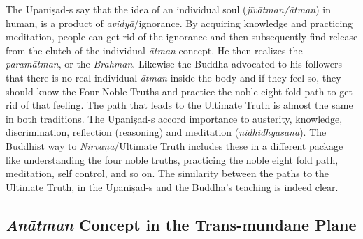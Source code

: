 The Upaniṣad-s say that the idea of an individual soul (\textit{jīvātman/ātman}) in human, is a product of \textit{avidyā}/ignorance. By acquiring knowledge and practicing meditation, people can get rid of the ignorance and then subsequently find release from the clutch of the individual \textit{ātman} concept. He then realizes the \textit{paramātman}, or the \textit{Brahman}. Likewise the Buddha advocated to his followers that there is no real individual \textit{ātman} inside the body and if they feel so, they should know the Four Noble Truths and practice the noble eight fold path to get rid of that feeling. The path that leads to the Ultimate Truth is almost the same in both traditions. The Upaniṣad-s accord importance to austerity, knowledge, discrimination, reflection (reasoning) and meditation (\textit{nidhidhyāsana}). The Buddhist way to \textit{Nirvāṇa}/Ultimate Truth includes these in a different package like understanding the four noble truths, practicing the noble eight fold path, meditation, self control, and so on. The similarity between the paths to the Ultimate Truth, in the Upaniṣad-s and the Buddha’s teaching is indeed clear.

\vspace{-.3cm}

\subsection*{\textit{Anātman} Concept in the Trans-mundane Plane}


